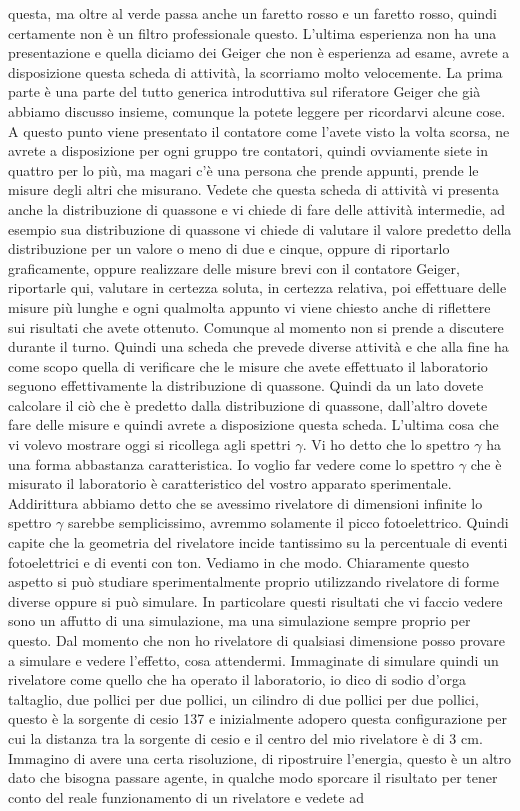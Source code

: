{questa, ma oltre al verde passa anche un faretto rosso e un faretto rosso, quindi certamente non è un filtro professionale questo. L'ultima esperienza non ha una presentazione e quella diciamo dei Geiger che non è esperienza ad esame, avrete a disposizione questa scheda di attività, la scorriamo molto velocemente. La prima parte è una parte del tutto generica introduttiva sul riferatore Geiger che già abbiamo discusso insieme, comunque la potete leggere per ricordarvi alcune cose. A questo punto viene presentato il contatore come l'avete visto la volta scorsa, ne avrete a disposizione per ogni gruppo tre contatori, quindi ovviamente siete in quattro per lo più, ma magari c'è una persona che prende appunti, prende le misure degli altri che misurano. Vedete che questa scheda di attività vi presenta anche la distribuzione di quassone e vi chiede di fare delle attività intermedie, ad esempio sua distribuzione di quassone vi chiede di valutare il valore predetto della distribuzione per un valore o meno di due e cinque, oppure di riportarlo graficamente, oppure realizzare delle misure brevi con il contatore Geiger, riportarle qui, valutare in certezza soluta, in certezza relativa, poi effettuare delle misure più lunghe e ogni qualmolta appunto vi viene chiesto anche di riflettere sui risultati che avete ottenuto. Comunque al momento non si prende a discutere durante il turno. Quindi una scheda che prevede diverse attività e che alla fine ha come scopo quella di verificare che le misure che avete effettuato il laboratorio seguono effettivamente la distribuzione di quassone. Quindi da un lato dovete calcolare il ciò che è predetto dalla distribuzione di quassone, dall'altro dovete fare delle misure e quindi avrete a disposizione questa scheda. L'ultima cosa che vi volevo mostrare oggi si ricollega agli spettri $\gamma$. Vi ho detto che lo spettro $\gamma$ ha una forma abbastanza caratteristica. Io voglio far vedere come lo spettro $\gamma$ che è misurato il laboratorio è caratteristico del vostro apparato sperimentale. Addirittura abbiamo detto che se avessimo rivelatore di dimensioni infinite lo spettro $\gamma$ sarebbe semplicissimo, avremmo solamente il picco fotoelettrico. Quindi capite che la geometria del rivelatore incide tantissimo su la percentuale di eventi fotoelettrici e di eventi con ton. Vediamo in che modo. Chiaramente questo aspetto si può studiare sperimentalmente proprio utilizzando rivelatore di forme diverse oppure si può simulare. In particolare questi risultati che vi faccio vedere sono un affutto di una simulazione, ma una simulazione sempre proprio per questo. Dal momento che non ho rivelatore di qualsiasi dimensione posso provare a simulare e vedere l'effetto, cosa attendermi. Immaginate di simulare quindi un rivelatore come quello che ha operato il laboratorio, io dico di sodio d'orga taltaglio, due pollici per due pollici, un cilindro di due pollici per due pollici, questo è la sorgente di cesio 137 e inizialmente adopero questa configurazione per cui la distanza tra la sorgente di cesio e il centro del mio rivelatore è di 3 cm. Immagino di avere una certa risoluzione, di ripostruire l'energia, questo è un altro dato che bisogna passare agente, in qualche modo sporcare il risultato per tener conto del reale funzionamento di un rivelatore e vedete ad }
